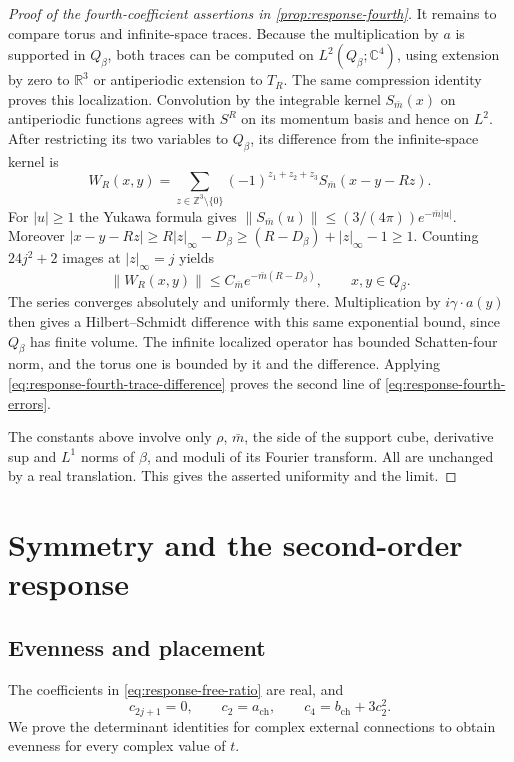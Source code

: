 \documentclass[11pt,letterpaper,reqno]{amsart}
\newcommand{\R}{\mathbb R}
\newcommand{\C}{\mathbb C}
\newcommand{\Z}{\mathbb Z}
\begin{document}
\begin{proof}[Proof of the fourth-coefficient assertions in \cref{prop:response-fourth}]
It remains to compare torus and infinite-space traces.
Because the multiplication by $a$ is supported in
$Q_\beta$, both traces can be computed on $L^2(Q_\beta;\C^4)$,
using extension by zero to $\R^3$ or antiperiodic extension
to $T_R$. The same compression identity proves this
localization. Convolution by the integrable kernel
$S_{\bar m}(x)$ on antiperiodic functions agrees with
$S^R$ on its momentum basis and hence on $L^2$.
After restricting its two variables to $Q_\beta$, its
difference from the infinite-space kernel is
\[
 W_R(x,y)=\sum_{z\in\Z^3\setminus\{0\}}
                  (-1)^{z_1+z_2+z_3}S_{\bar m}(x-y-Rz).
\]
For $|u|\ge1$ the Yukawa formula gives
$\|S_{\bar m}(u)\|\le(3/(4\pi))e^{-\bar m|u|}$.
Moreover $|x-y-Rz|\ge R|z|_\infty-D_\beta\ge
(R-D_\beta)+|z|_\infty-1\ge1$. Counting
$24j^2+2$ images at $|z|_\infty=j$ yields
\[
 \|W_R(x,y)\|\le C_{\bar m}e^{-\bar m(R-D_\beta)},
 \qquad x,y\in Q_\beta.
\]
The series converges absolutely and uniformly there.
Multiplication by $i\gamma\cdot a(y)$ then gives a
Hilbert--Schmidt difference with this same exponential
bound, since $Q_\beta$ has finite volume. The infinite
localized operator has bounded Schatten-four norm,
and the torus one is bounded by it and the difference.
Applying \eqref{eq:response-fourth-trace-difference}
proves the second line of \eqref{eq:response-fourth-errors}.

The constants above involve only $\rho$, $\bar m$,
the side of the support cube, derivative sup and
$L^1$ norms of $\beta$, and moduli of its Fourier
transform. All are unchanged by a real translation.
This gives the asserted uniformity and the limit.
\end{proof}

\section{Symmetry and the second-order response}\label{subsec:response-symmetry}

\subsection{Evenness and placement}

The coefficients in \eqref{eq:response-free-ratio} are real, and
\begin{equation}\label{eq:response-coefficient-relations}
 c_{2j+1}=0,\qquad c_2=a_{\mathrm{ch}},\qquad
                 c_4=b_{\mathrm{ch}}+3c_2^2.
\end{equation}
We prove the determinant identities for complex external connections
to obtain evenness for every complex value of $t$.
\end{document}
